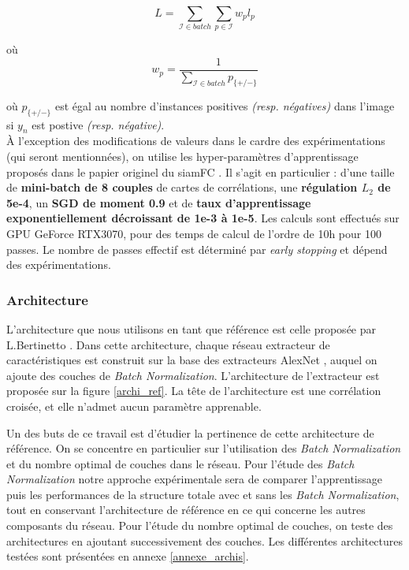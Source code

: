 \documentclass[10pt,twocolumn,letterpaper,french]{article}
\newcommand\norm[1]{\left\lVert#1\right\rVert}
\begin{document}
$$L = \sum_{\mathcal{I} \in batch} \sum_{p \in \mathcal{I}} w_{p}l_p$$

où $$w_{p} = \frac{1}{\sum_{\mathcal{I} \in batch}p_{\{+/-\}}} $$


où $p_{\{+/-\}}$ est égal au nombre d'instances positives \textit{(resp. négatives)} dans l'image si $y_{n}$ est postive \textit{(resp. négative)}. \\

À l'exception des modifications de valeurs dans le cardre des expérimentations (qui seront mentionnées), on utilise les hyper-paramètres d'apprentissage proposés dans le papier originel du siamFC \cite{siamfc}. Il s'agit en particulier : d'une taille de \textbf{mini-batch de 8 couples} de cartes de corrélations, une \textbf{régulation $L_2$ de 5e-4}, un \textbf{SGD de moment 0.9} et de \textbf{taux d'apprentissage exponentiellement décroissant de 1e-3 à 1e-5}. Les calculs sont effectués sur GPU GeForce RTX3070, pour des temps de calcul de l'ordre de 10h pour 100 passes. Le nombre de passes effectif est déterminé par \textit{early stopping} et dépend des expérimentations.


\subsubsection*{Architecture}

L'architecture que nous utilisons en tant que référence est celle proposée par L.Bertinetto \cite{siamfc}. Dans cette architecture, chaque réseau extracteur de caractéristiques est construit sur la base des extracteurs AlexNet \cite{alexnet}, auquel on ajoute des couches de \textit{Batch Normalization}. L'architecture de l'extracteur est proposée sur la figure \ref{archi_ref}. La tête de l'architecture est une corrélation croisée, et elle n'admet aucun paramètre apprenable.

Un des buts de ce travail est d'étudier la pertinence de cette architecture de référence. On se concentre en particulier sur l'utilisation des \textit{Batch Normalization} et du nombre optimal de couches dans le réseau. Pour l'étude des \textit{Batch Normalization} notre approche expérimentale sera de comparer l'apprentissage puis les performances de la structure totale avec et sans les \textit{Batch Normalization}, tout en conservant l'architecture de référence en ce qui concerne les autres composants du réseau. Pour l'étude du nombre optimal de couches, on teste des architectures en ajoutant successivement des couches. Les différentes architectures testées sont présentées en annexe \ref{annexe_archis}.
\end{document}
